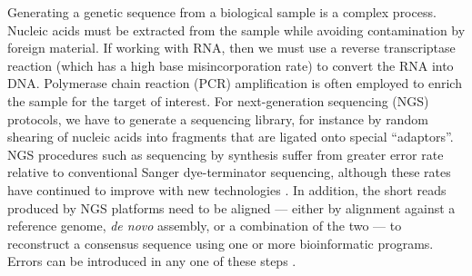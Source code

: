 \documentclass[12pt]{article}
\begin{document}
\doublespacing
\pagewiselinenumbers

\vspace{1em}

Generating a genetic sequence from a biological sample is a complex process.
Nucleic acids must be extracted from the sample while avoiding contamination by foreign material.
If working with RNA, then we must use a reverse transcriptase reaction (which has a high base misincorporation rate) to convert the RNA into DNA. 
Polymerase chain reaction (PCR) amplification is often employed to enrich the sample for the target of interest.
For next-generation sequencing (NGS) protocols, we have to generate a sequencing library, for instance by random shearing of nucleic acids into fragments that are ligated onto special ``adaptors''.
NGS procedures such as sequencing by synthesis suffer from greater error rate relative to conventional Sanger dye-terminator sequencing, although these rates have continued to improve with new technologies \citep{fullerChallengesSequencingSynthesis2009, goodwinComingAgeTen2016, salkEnhancingAccuracyNextgeneration2018}. 
In addition, the short reads produced by NGS platforms need to be aligned --- either by alignment against a reference genome, \emph{de novo} assembly, or a combination of the two --- to reconstruct a consensus sequence using one or more bioinformatic programs.
Errors can be introduced in any one of these steps \citep{beerenwinkelUltradeepSequencingAnalysis2011, oraweAccountingUncertaintyDNA2015}.
\end{document}
